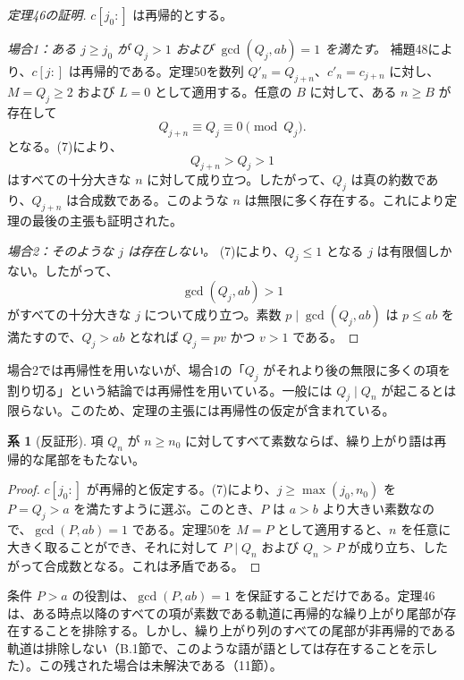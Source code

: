 \documentclass[11pt,reqno]{amsart}
\theoremstyle{definition}
\newtheorem{corollary}[theorem]{系}
\theoremstyle{definition}
\theoremstyle{remark}
\begin{document}
\begin{proof}[定理46の証明]\leavevmode\label{proof:46}
\(c[j_0:]\) は再帰的とする。

\emph{場合1：ある \(j\ge j_0\) が \(Q_j>1\) および \(\gcd(Q_j,ab)=1\) を満たす。} 補題48により、\(c[j:]\) は再帰的である。定理50を数列 \(Q'_n=Q_{j+n}\)、\(c'_n=c_{j+n}\) に対し、\(M=Q_j\ge2\) および \(L=0\) として適用する。任意の \(B\) に対して、ある \(n\ge B\) が存在して
\[
Q_{j+n}\equiv Q_j\equiv0\pmod{Q_j}.
\]
となる。(7)により、
\[
Q_{j+n}>Q_j>1
\]
はすべての十分大きな \(n\) に対して成り立つ。したがって、\(Q_j\) は真の約数であり、\(Q_{j+n}\) は合成数である。このような \(n\) は無限に多く存在する。これにより定理の最後の主張も証明された。

\emph{場合2：そのような \(j\) は存在しない。} (7)により、\(Q_j\le1\) となる \(j\) は有限個しかない。したがって、
\[
\gcd(Q_j,ab)>1
\]
がすべての十分大きな \(j\) について成り立つ。素数 \(p\mid\gcd(Q_j,ab)\) は \(p\le ab\) を満たすので、\(Q_j>ab\) となれば
\(Q_j=pv\) かつ \(v>1\) である。\qedhere
\end{proof}

場合2では再帰性を用いないが、場合1の「\(Q_j\) がそれより後の無限に多くの項を割り切る」という結論では再帰性を用いている。一般には \(Q_j\mid Q_n\) が起こるとは限らない。このため、定理の主張には再帰性の仮定が含まれている。

\begin{samepage}
\begin{corollary}[反証形]\leavevmode\label{thm:51}
項 \(Q_n\) が \(n\ge n_0\) に対してすべて素数ならば、繰り上がり語は再帰的な尾部をもたない。
\label{thm-end:51}
\end{corollary}
\end{samepage}

\begin{proof}\leavevmode\label{proof:51}
\(c[j_0:]\) が再帰的と仮定する。(7)により、\(j\ge\max(j_0,n_0)\) を \(P=Q_j>a\) を満たすように選ぶ。このとき、\(P\) は \(a>b\) より大きい素数なので、\(\gcd(P,ab)=1\) である。定理50を \(M=P\) として適用すると、\(n\) を任意に大きく取ることができ、それに対して \(P\mid Q_n\) および \(Q_n>P\) が成り立ち、したがって合成数となる。これは矛盾である。\qedhere
\end{proof}

条件 \(P>a\) の役割は、\(\gcd(P,ab)=1\) を保証することだけである。定理46は、ある時点以降のすべての項が素数である軌道に再帰的な繰り上がり尾部が存在することを排除する。しかし、繰り上がり列のすべての尾部が非再帰的である軌道は排除しない（B.1節で、このような語が語としては存在することを示した）。この残された場合は未解決である（11節）。
\end{document}
